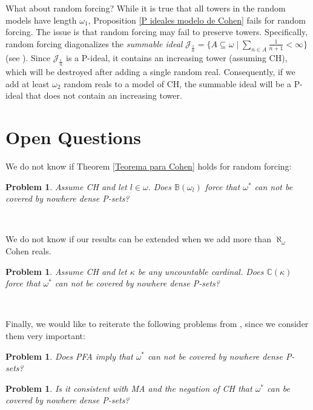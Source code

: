\documentclass{article}%
\newtheorem{problem}[theorem]{Problem}
\begin{document}
What about random forcing? While it is true that all towers in the random
models have length $\omega_{1}$, Proposition \ref{P ideales modelo de Cohen}
fails for random forcing. The issue is that random forcing may fail to
preserve towers. Specifically, random forcing diagonalizes the \emph{summable
ideal} $\mathcal{J}_{\frac{1}{n}}=\{A\subseteq\omega\mid\sum\limits_{n\in
A}\frac{1}{n+1}<\infty\}$ (see \cite{CardinalInvariantsofAnalyticPIdeals}).
Since $\mathcal{J}_{\frac{1}{n}}$ is a \textsf{P}-ideal\textsf{, }it contains
an increasing tower (assuming \textsf{CH}), which will be destroyed after
adding a single random real. Consequently, if we add at least $\omega_{2}$
random reals to a model of \textsf{CH, }the summable ideal will be a
\textsf{P}-ideal that does not contain an increasing tower.

\section{Open Questions}

We do not know if Theorem \ref{Teorema para Cohen} holds for random forcing:

\begin{problem}
Assume \textsf{CH }and let $l\in\omega.$ Does $\mathbb{B}\left(  \omega
_{l}\right)  $ force that $\omega^{\ast}$ can not be covered by nowhere dense
\textsf{P}-sets?
\end{problem}

\qquad\ \qquad\ \ 

We do not know if our results can be extended when we add more than
$\aleph_{\omega}$ Cohen reals.

\begin{problem}
Assume \textsf{CH }and let $\kappa$ be any uncountable cardinal. Does
$\mathbb{C}\left(  \kappa\right)  $ force that $\omega^{\ast}$ can not be
covered by nowhere dense \textsf{P}-sets?
\end{problem}

\qquad\ \qquad\ \ 

Finally, we would like to reiterate the following problems from
\cite{CozeroAccesiblePoints}, since we consider them very important:

\begin{problem}
Does \textsf{PFA }imply that $\omega^{\ast}$ can not be covered by nowhere
dense \textsf{P}-sets?
\end{problem}

\begin{problem}
Is it consistent with \textsf{MA }and the negation of \textsf{CH} that
$\omega^{\ast}$ can be covered by nowhere dense \textsf{P}-sets?
\end{problem}
\end{document}
